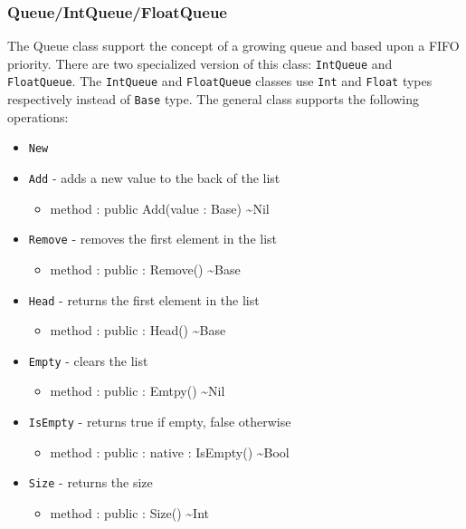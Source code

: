 \documentclass[11pt]{article}
\begin{document}
\subsubsection{Queue/IntQueue/FloatQueue}
The Queue class support the concept of a growing queue and based upon
a FIFO priority.  There are two specialized version of this class:
\texttt{IntQueue} and \texttt{FloatQueue}.  The \texttt{IntQueue} and
\texttt{FloatQueue} classes use \texttt{Int} and \texttt{Float} types
respectively instead of \texttt{Base} type.  The general class
supports the following operations:
\begin{itemize}
\item \texttt{New}
\item \texttt{Add} - adds a new value to the back of the list
  \begin{itemize}
  \item method : public Add(value : Base) \textasciitilde Nil
  \end{itemize}
\item \texttt{Remove} - removes the first element in the list
  \begin{itemize}
  \item method : public : Remove() \textasciitilde Base
  \end{itemize}
\item \texttt{Head} - returns the first element in the list
  \begin{itemize}
  \item method : public : Head() \textasciitilde Base
  \end{itemize}
\item \texttt{Empty} - clears the list
  \begin{itemize}
  \item method : public : Emtpy() \textasciitilde Nil
  \end{itemize}
\item \texttt{IsEmpty} - returns true if empty, false otherwise
  \begin{itemize}
  \item method : public : native : IsEmpty() \textasciitilde Bool
  \end{itemize}
\item \texttt{Size} - returns the size
  \begin{itemize}
  \item method : public : Size() \textasciitilde Int
  \end{itemize}
\end{itemize}
\end{document}
